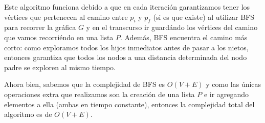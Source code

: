 \documentclass[letterpaper,11pt]{article}
\begin{document}
\begin{enumerate}
    Este algoritmo funciona debido a que en cada iteración garantizamos tener
    los vértices que pertenecen al camino entre $p_i$ y $p_f$ (si es que 
    existe) al utilizar BFS para recorrer la gráfica $G$ y en el transcurso ir 
    guardándo los vértices del camino que vamos recorriéndo en una lista $P$. 
    Además, BFS encuentra el camino más corto: como exploramos todos los hijos
    inmediatos antes de pasar a los nietos, entonces garantiza que todos los 
    nodos a una distancia determinada del nodo padre se exploren al mismo tiempo.

    Ahora bien, sabemos que la complejidad de BFS es $O(V+E)$ y como las únicas 
    operaciones extra que realizamos son la creación de una lista $P$ e ir 
    agregando elementos a ella (ambas en tiempo constante), entonces la 
    complejidad total del algoritmo es de $O(V + E)$.
\end{enumerate}
\end{document}
